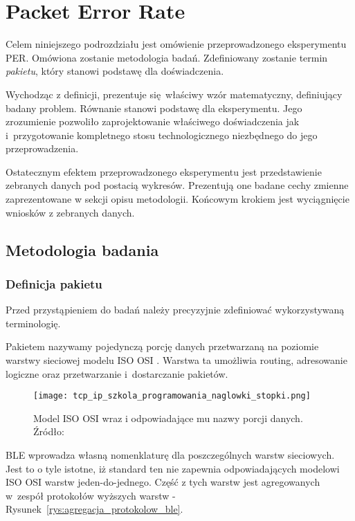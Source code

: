 \section{Packet Error Rate}

Celem niniejszego podrozdziału jest omówienie przeprowadzonego eksperymentu \gls{PER}. Omówiona zostanie
metodologia badań. Zdefiniowany zostanie termin \textit{pakietu}, który stanowi podstawę dla
doświadczenia.

Wychodząc z definicji, prezentuje się właściwy wzór matematyczny, definiujący badany problem. Równanie
stanowi podstawę dla eksperymentu. Jego zrozumienie pozwoliło zaprojektowanie właściwego doświadczenia
jak i~przygotowanie kompletnego stosu technologicznego niezbędnego do jego przeprowadzenia.

Ostatecznym efektem przeprowadzonego eksperymentu jest przedstawienie zebranych danych pod postacią
wykresów. Prezentują one badane cechy zmienne zaprezentowane w sekcji opisu metodologii. Końcowym
krokiem jest wyciągnięcie wniosków z zebranych danych.
 
\subsection{Metodologia badania}
\subsubsection{Definicja pakietu}
Przed przystąpieniem do badań należy precyzyjnie zdefiniować wykorzystywaną terminologię.

Pakietem nazywamy pojedynczą porcję danych przetwarzaną na poziomie warstwy sieciowej modelu ISO OSI \cite{sa_tcpip_nodate}.
Warstwa ta umożliwia routing, adresowanie logiczne oraz przetwarzanie i~dostarczanie pakietów.

\begin{figure}[!ht]
	\centering \texttt{[image: tcp\_ip\_szkola\_programowania\_naglowki\_stopki.png]} 
	\caption{Model ISO OSI wraz i odpowiadające mu nazwy porcji danych. Źródło: \cite{sa_tcpip_nodate}}
	\label{rys:iso_osi_model_nazwy_grup_danych}
\end{figure}

\gls{BLE} wprowadza własną nomenklaturę dla poszczególnych warstw sieciowych. Jest to o tyle istotne, iż standard ten
nie zapewnia odpowiadających modelowi ISO OSI warstw jeden-do-jednego. Część z tych warstw jest agregowanych w~zespół 
protokołów wyższych warstw - Rysunek~\ref{rys:agregacja_protokolow_ble}. 


